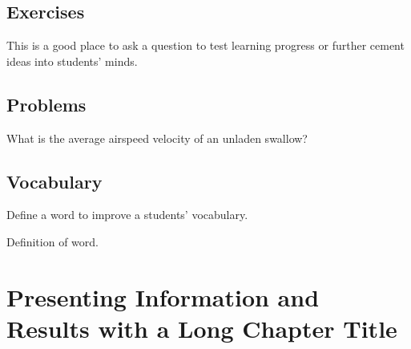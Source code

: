 \documentclass[
	11pt,
	fleqn,
	a4paper,
]{LegrandOrangeBook}
\begin{document}
\section{Exercises}

\begin{exercise} %
    This is a good place to ask a question to test learning progress or further cement ideas into students' minds.
\end{exercise}


\section{Problems}

\begin{problem} %
What is the average airspeed velocity of an unladen swallow?
\end{problem}


\section{Vocabulary}

Define a word to improve a students' vocabulary.

\begin{vocabulary}[Word] %
    Definition of word.
\end{vocabulary}


\chapterspaceabove{6.25cm} %
\chapterspacebelow{7.5cm} %


\chapter{Presenting Information and Results with a Long Chapter Title}
\end{document}
